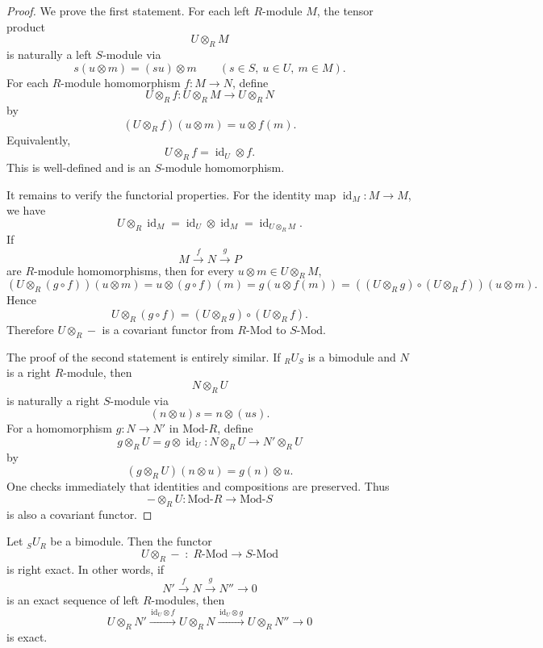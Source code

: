 \begin{proof}
    We prove the first statement. For each left $R$-module $M$, the tensor product
    \[
        U \otimes_R M
    \]
    is naturally a left $S$-module via
    \[
        s(u \otimes m)=(su)\otimes m
        \qquad
        (s\in S,\ u\in U,\ m\in M).
    \]
    For each $R$-module homomorphism $f:M\to N$, define
    \[
        U\otimes_R f: U\otimes_R M \to U\otimes_R N
    \]
    by
    \[
        (U\otimes_R f)(u\otimes m)=u\otimes f(m).
    \]
    Equivalently,
    \[
        U\otimes_R f=\operatorname{id}_U\otimes f.
    \]
    This is well-defined and is an $S$-module homomorphism.

    It remains to verify the functorial properties. For the identity map $\operatorname{id}_M:M\to M$, we have
    \[
        U\otimes_R \operatorname{id}_M=\operatorname{id}_U\otimes \operatorname{id}_M
        =\operatorname{id}_{U\otimes_R M}.
    \]
    If
    \[
        M \xrightarrow{f} N \xrightarrow{g} P
    \]
    are $R$-module homomorphisms, then for every $u\otimes m\in U\otimes_R M$,
    \[
        (U\otimes_R (g\circ f))(u\otimes m)
        = u\otimes (g\circ f)(m)
        = g(u\otimes f(m))
        = ((U\otimes_R g)\circ (U\otimes_R f))(u\otimes m).
    \]
    Hence
    \[
        U\otimes_R (g\circ f)=(U\otimes_R g)\circ (U\otimes_R f).
    \]
    Therefore $U\otimes_R -$ is a covariant functor from $R\text{-}\mathrm{Mod}$ to $S\text{-}\mathrm{Mod}$.

    The proof of the second statement is entirely similar. If ${}_R U_S$ is a bimodule and $N$ is a right $R$-module, then
    \[
        N\otimes_R U
    \]
    is naturally a right $S$-module via
    \[
        (n\otimes u)s=n\otimes (us).
    \]
    For a homomorphism $g:N\to N'$ in $\mathrm{Mod}\text{-}R$, define
    \[
        g\otimes_R U = g\otimes \operatorname{id}_U : N\otimes_R U \to N'\otimes_R U
    \]
    by
    \[
        (g\otimes_R U)(n\otimes u)=g(n)\otimes u.
    \]
    One checks immediately that identities and compositions are preserved. Thus
    \[
        -\otimes_R U:\mathrm{Mod}\text{-}R\to \mathrm{Mod}\text{-}S
    \]
    is also a covariant functor.
\end{proof}

\begin{theorem}
    Let ${}_S U_R$ be a bimodule. Then the functor
    \[
        U\otimes_R - \;:\; R\text{-Mod}\longrightarrow S\text{-Mod}
    \]
    is right exact. In other words, if
    \[
        N' \xrightarrow{\,f\,} N \xrightarrow{\,g\,} N'' \longrightarrow 0
    \]
    is an exact sequence of left $R$-modules, then
    \[
        U\otimes_R N' \xrightarrow{\,\mathrm{id}_U\otimes f\,}
        U\otimes_R N \xrightarrow{\,\mathrm{id}_U\otimes g\,}
        U\otimes_R N'' \longrightarrow 0
    \]
    is exact.
\end{theorem}

